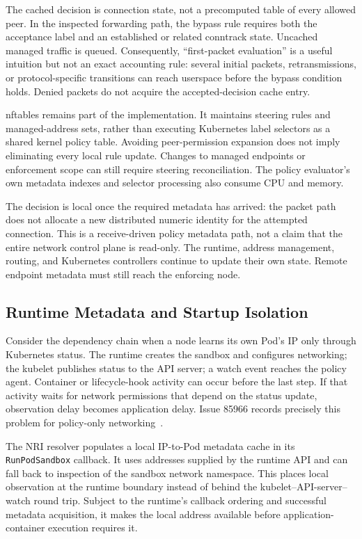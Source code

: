 \documentclass[letterpaper,twocolumn,10pt]{article}
\begin{document}
The cached decision is connection state, not a precomputed table of every
allowed peer. In the inspected forwarding path, the bypass rule requires
both the acceptance label and an established or related conntrack state.
Uncached managed traffic is queued. Consequently, ``first-packet
evaluation'' is a useful intuition but not an exact accounting rule:
several initial packets, retransmissions, or protocol-specific transitions
can reach userspace before the bypass condition holds. Denied packets
do not acquire the accepted-decision cache entry.

nftables remains part of the implementation. It maintains steering rules
and managed-address sets, rather than executing Kubernetes label selectors
as a shared kernel policy table. Avoiding peer-permission expansion does
not imply eliminating every local rule update. Changes to managed
endpoints or enforcement scope can still require steering reconciliation.
The policy evaluator's own metadata indexes and selector processing also
consume CPU and memory.

The decision is local once the required metadata has arrived: the packet
path does not allocate a new distributed numeric identity for the attempted
connection. This is a receive-driven policy metadata path, not a claim
that the entire network control plane is read-only. The runtime, address
management, routing, and Kubernetes controllers continue to update their
own state. Remote endpoint metadata must still reach the enforcing node.

\subsection{Runtime Metadata and Startup Isolation}
Consider the dependency chain when a node learns its own Pod's IP only
through Kubernetes status. The runtime creates the sandbox and configures
networking; the kubelet publishes status to the API server; a watch event
reaches the policy agent. Container or lifecycle-hook activity can occur
before the last step. If that activity waits for network permissions that
depend on the status update, observation delay becomes application delay.
Issue 85966 records precisely this problem for policy-only
networking~\cite{k8s85966}.

The NRI resolver populates a local IP-to-Pod metadata cache in its
\texttt{RunPodSandbox} callback. It uses addresses supplied by the runtime
API and can fall back to inspection of the sandbox network namespace.
This places local observation at the runtime boundary instead of behind
the kubelet--API-server--watch round trip. Subject to the runtime's callback
ordering and successful metadata acquisition, it makes the local address
available before application-container execution requires it.
\end{document}
